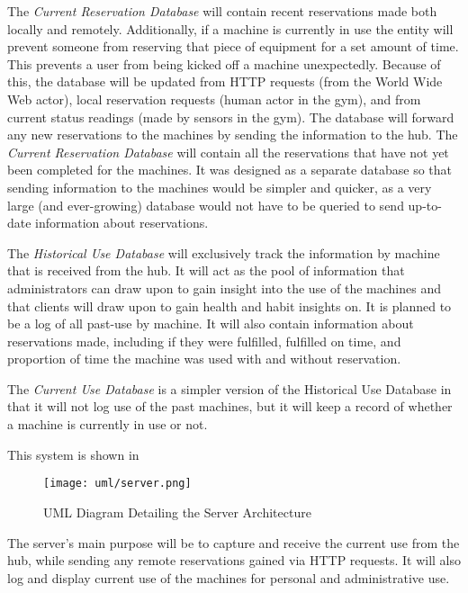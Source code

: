 \documentclass[PPFS.tex]{template/subfiles}
\newcommand{\sn}[1]{\textit{#1}}
\begin{document}
The \sn{Current Reservation Database} will contain recent reservations made both locally and remotely. Additionally, if a machine is currently in use the entity will prevent someone from reserving that piece of equipment for a set amount of time. This prevents a user from being kicked off a machine unexpectedly. Because of this, the database will be updated from HTTP requests (from the World Wide Web actor), local reservation requests (human actor in the gym), and from current status readings (made by sensors in the gym). The database will forward any new reservations to the machines by sending the information to the hub. The \sn{Current Reservation Database} will contain all the reservations that have not yet been completed for the machines. It was designed as a separate database so that sending information to the machines would be simpler and quicker, as a very large (and ever-growing) database would not have to be queried to send up-to-date information about reservations.

The \sn{Historical Use Database} will exclusively track the information by machine that is received from the hub. It will act as the pool of information that administrators can draw upon to gain insight into the use of the machines and that clients will draw upon to gain health and habit insights on. It is planned to be a log of all past-use by machine. It will also contain information about reservations made, including if they were fulfilled, fulfilled on time, and proportion of time the machine was used with and without reservation.

The \sn{Current Use Database} is a simpler version of the Historical Use Database in that it will not log use of the past machines, but it will keep a record of whether a machine is currently in use or not.

This system is shown in 

\begin{figure}[H]
    \centering
    \texttt{[image: uml/server.png]}
    \caption{UML Diagram Detailing the Server Architecture}
\end{figure}

The server's main purpose will be to capture and receive the current use from the hub, while sending any remote reservations gained via HTTP requests. It will also log and display current use of the machines for personal and administrative use.
\end{document}
